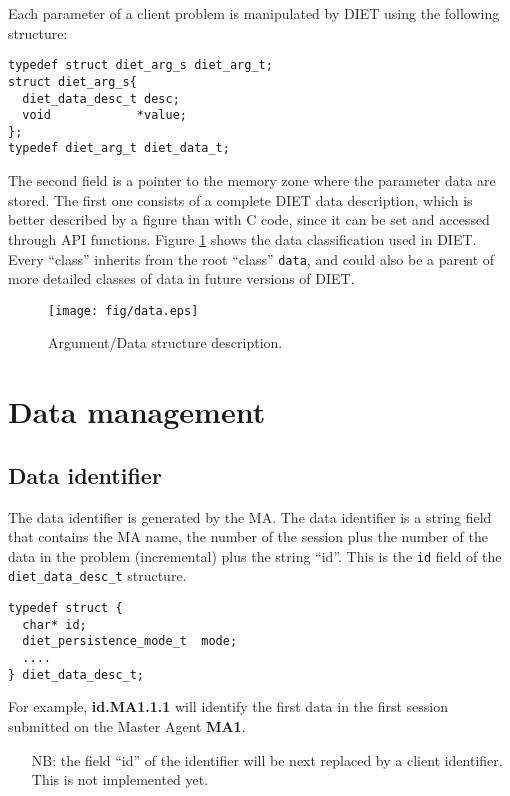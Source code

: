 Each parameter of a client problem is manipulated by DIET using the following
structure:
{\footnotesize
\begin{verbatim}
typedef struct diet_arg_s diet_arg_t;
struct diet_arg_s{
  diet_data_desc_t desc;
  void            *value;
};
typedef diet_arg_t diet_data_t;
\end{verbatim}
}

The second field is a pointer to the memory zone where the parameter data are
stored. The first one consists of a complete DIET data description, which is
better described by a figure than with C code, since it can be set and accessed
through API functions. Figure \ref{fig:data} shows the data classification used
in DIET. Every ``class'' inherits from the root ``class'' \texttt{data}, and
could also be a parent of more detailed classes of data in future versions of
DIET.

\begin{figure}[hpt]
 \begin{center}
  \texttt{[image: fig/data.eps]}
  \caption{Argument/Data structure description.}
  \label{fig:data}
 \end{center}
\end{figure}


\section{Data management}
\label{sec:datamgt}

\subsection{Data identifier}
\label{ssec:dataid}
The data identifier is generated by the MA. The data identifier is a
string field that contains the MA name, the number of the session plus
the number of the data in the problem (incremental) plus the string
``id''.  This is the \texttt{id} field of the
\texttt{diet\_data\_desc\_t} structure.

{\footnotesize
\begin{verbatim}
typedef struct {
  char* id;  
  diet_persistence_mode_t  mode;
  ....
} diet_data_desc_t;
\end{verbatim}
}

For example, \textbf{id.MA1.1.1} will identify the first data
in the first session submitted on the Master Agent \textbf{MA1}.


\begin{itemize}
\item[NB:] the field ``id'' of the identifier will be next replaced by a
client identifier. This is not implemented yet.
\end{itemize}

